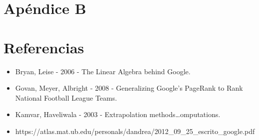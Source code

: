
\section{Apéndice B}

\section{Referencias}

\begin{itemize}
\item Bryan, Leise - 2006 - The Linear Algebra behind Google.
\item  Govan, Meyer, Albright - 2008 - Generalizing Google’s PageRank to Rank National Football League Teams.
\item Kamvar, Haveliwala - 2003 - Extrapolation methods…omputations.
\item https://atlas.mat.ub.edu/personals/dandrea/2012_09_25_escrito_google.pdf
\end{itemize}